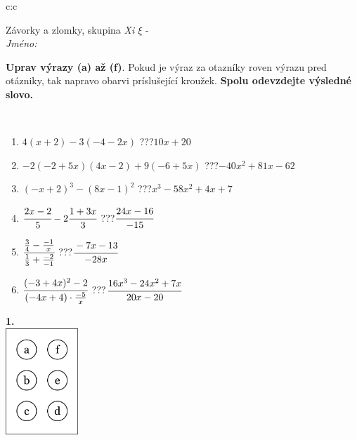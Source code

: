 \documentclass[10pt]{report}
\begin{document}
\begin{tabular}{c:c}
\begin{minipage}[c][104.5mm][t]{0.5\linewidth}
\begin{center}
\vspace{7mm}
{\huge Závorky a zlomky, skupina \textit{Xi $\xi$} -}\\[5mm]
\textit{Jméno:}\phantom{xxxxxxxxxxxxxxxxxxxxxxxxxxxxxxxxxxxxxxxxxxxxxxxxxxxxxxxxxxxxxxxxx}\\[5mm]
\begin{minipage}{0.95\linewidth}
\begin{center}
\textbf{Uprav výrazy (a) až (f)}. Pokud je výraz za otazníky roven výrazu pred otázniky, tak napravo obarvi príslušející kroužek. \textbf{Spolu odevzdejte výsledné slovo.}
\end{center}
\end{minipage}
\\[1mm]
\begin{minipage}{0.79\linewidth}
\begin{center}
\begin{varwidth}{\linewidth}
\begin{enumerate}
\normalsize
\item $4(x+2)-3(-4-2x)$\quad \dotfill\; ???\;\dotfill \quad $10x+20$
\item $-2(-2+5x)(4x-2)+9(-6+5x)$\quad \dotfill\; ???\;\dotfill \quad $-40x^2+81x-62$
\item $(-x+2)^3-(8x-1)^2$\quad \dotfill\; ???\;\dotfill \quad $x^3-58x^2+4x+7$
\item $\cfrac{2x-2}{5}-2\cfrac{1+3x}{3}$\quad \dotfill\; ???\;\dotfill \quad $\cfrac{24x-16}{-15}$
\item $\cfrac{\frac{3}{4}-\frac{-1}{x}}{\frac{1}{3}+\frac{-2}{-1}}$\quad \dotfill\; ???\;\dotfill \quad $\cfrac{-7x-13}{-28x}$
\item $\cfrac{(-3+4x)^2-2}{(-4x+4)\cdot\frac{-5}{x}}$\quad \dotfill\; ???\;\dotfill \quad $\cfrac{16x^3-24x^2+7x}{20x-20}$
\end{enumerate}
\end{varwidth}
\end{center}
\end{minipage}
\begin{minipage}{0.20\linewidth}
\begin{center}
{\Huge\bfseries 1.} \\[2mm]
\includegraphics[height=40mm]{../images/braille.png}

\end{center}
\end{minipage}
\end{center}
\end{minipage}
\end{tabular}
\end{document}
